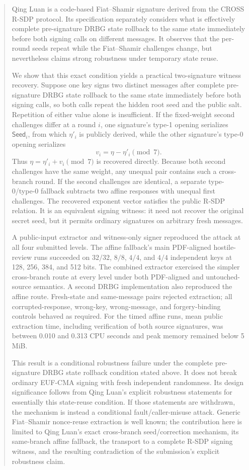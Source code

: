 \documentclass[11pt,a4paper]{article}
\begin{document}
\begin{abstract}
Qing Luan is a code-based Fiat--Shamir signature derived from the CROSS R-SDP
protocol.  Its specification separately considers what is effectively
complete pre-signature DRBG state rollback to the same state immediately before
both signing calls on different messages.  It
observes that the per-round seeds repeat while the Fiat--Shamir challenges
change, but nevertheless claims strong robustness under temporary state reuse.

We show that this exact condition yields a practical two-signature witness
recovery.  Suppose one key signs two distinct messages after complete
pre-signature DRBG state rollback to the same state immediately before both
signing calls, so both calls repeat the hidden root seed and the public salt.
Repetition of either value alone is insufficient.  If the
fixed-weight second challenges differ at a round $i$, one
signature's type-1 opening serializes $\mathsf{Seed}_i$, from which
$\eta'_i$ is publicly derived, while the other signature's type-0 opening
serializes
\[
                         v_i=\eta-\eta'_i\pmod 7.
\]
Thus $\eta=\eta'_i+v_i\pmod 7$ is recovered directly.  Because both second
challenges have the same weight, any unequal pair contains such a cross-branch
round.  If the second challenges are identical, a separate type-0/type-0
fallback subtracts two affine responses with unequal first challenges.  The
recovered exponent vector satisfies the public R-SDP relation.  It is an
equivalent signing witness: it need not recover the original secret seed, but
it permits ordinary signatures on arbitrary fresh messages.

A public-input extractor and witness-only signer reproduced the attack at all
four submitted levels.  The affine fallback's main PDF-aligned hostile-review
runs succeeded on $32/32$, $8/8$, $4/4$, and $4/4$ independent keys at 128,
256, 384, and 512 bits.  The combined extractor exercised the simpler
cross-branch route at every level under both PDF-aligned and untouched-source
semantics.  A second DRBG implementation also reproduced the affine route.
Fresh-state and same-message pairs rejected extraction; all corrupted-response,
wrong-key, wrong-message, and forgery-binding controls behaved as required.
For the timed affine runs, mean public extraction time, including verification
of both source signatures, was between 0.010 and 0.313 CPU seconds and peak
memory remained below 5 MiB.

This result is a conditional robustness failure under the complete
pre-signature DRBG state rollback condition stated above.  It does not break
ordinary EUF-CMA signing with fresh
independent randomness.  Its design significance follows from Qing Luan's
explicit robustness statements for essentially this state-reuse condition.  If
those statements are withdrawn, the mechanism is instead a conditional
fault/caller-misuse attack.  Generic Fiat--Shamir nonce-reuse extraction is
well known; the contribution here is limited to Qing Luan's exact
cross-branch seed/correction mechanism, its same-branch affine fallback, the
transport to a complete R-SDP signing witness, and the resulting contradiction
of the submission's explicit robustness claim.
\end{abstract}
\end{document}
